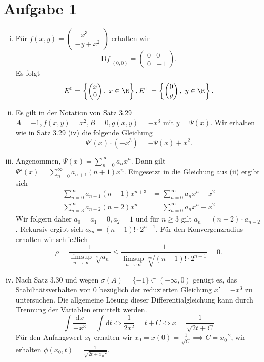\documentclass{article}
\begin{document}
    \section*{Aufgabe 1}
    \begin{enumerate}[(i)]
        \item Für $f(x,y) = \begin{pmatrix}
            -x^3\\ -y + x^2
        \end{pmatrix}$ erhalten wir
        \[
            \mathrm{D}f|_{(0,0)} =  \begin{pmatrix}
                0 & 0\\0&-1
            \end{pmatrix}.
        \]
        Es folgt $$E^0 = \left\{ \begin{pmatrix}
            x\\0
        \end{pmatrix},\; x\in \R\right\}, E^+ = \left\{ \begin{pmatrix}
            0\\y
        \end{pmatrix},\; y\in \R\right\}.$$
        \item Es gilt in der Notation von Satz 3.29 $A = -1, f(x,y) = x^2, B = 0, g(x,y) = -x^3$ mit $y = \Psi(x)$. 
        Wir erhalten wie in Satz 3.29 (iv) die folgende Gleichung
        \[
            \Psi'(x) \cdot (-x^3) = -\Psi(x) + x^2.  
        \]
        \item Angenommen, $\Psi(x) = \sum_{n = 0}^{\infty} a_nx^n$. Dann gilt $\Psi'(x) = \sum_{n = 0}^{\infty} a_{n+1}(n+1)x^n$.
        Eingesetzt in die Gleichung aus (ii) ergibt sich
        \begin{align*}
            \sum_{n = 0}^{\infty} a_{n+1}(n+1)x^{n+3} &= \sum_{n = 0}^{\infty} a_nx^n - x^2\\
            \sum_{n = 3}^{\infty} a_{n-2} (n-2)x^n &= \sum_{n = 0}^{\infty} a_nx^n -x^2
        \end{align*}
        Wir folgern daher $a_0 = a_1 = 0, a_2 = 1$ und für $n \geq 3$ gilt $a_n = (n-2)\cdot a_{n-2}$.
        Rekursiv ergibt sich $a_{2n} = (n-1)! \cdot 2^{n-1}$.
        Für den Konvergenzradius erhalten wir schließlich
        \[
            \rho = \frac{1}{\limsup\limits_{n \to \infty} \sqrt[n]{a_n}} \leq \frac{1}{\limsup\limits_{n \to \infty} \sqrt[2n]{(n-1)! \cdot 2^{n-1}}} = 0.
        \]
        \item Nach Satz 3.30 und wegen $\sigma(A) = \{-1\} \subset (-\infty, 0)$ genügt es, das Stabilitätsverhalten von $0$ bezüglich der reduzierten Gleichung $x' = -x^3$ zu untersuchen. 
        Die allgemeine Lösung dieser Differentialgleichung kann durch Trennung der Variablen ermittelt werden.
        \[
            \int \frac{\mathrm{d} x}{-x^3} = \int \mathrm{d}t \Leftrightarrow \frac{1}{2x^2} = t + C \Leftrightarrow x = \frac{1}{\sqrt{2t + C}}
        \]
        Für den Anfangswert $x_0$ erhalten wir $x_0 = x(0) = \frac{1}{\sqrt{C}} \implies C = x_0^{-2}$, wir erhalten $\phi(x_0, t) = \frac{1}{\sqrt{2t + x_0^{-2}}}$.
        
    \end{enumerate}
\end{document}
